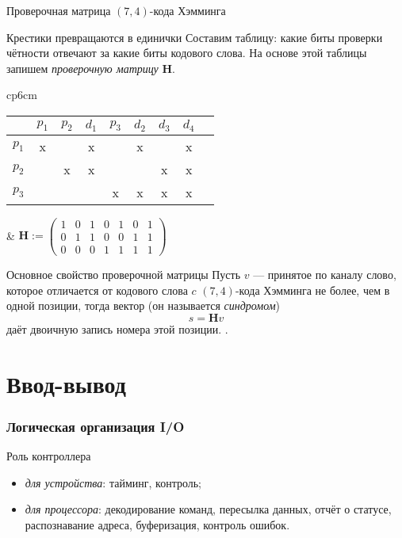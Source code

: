\begin{frame}{Проверочная матрица $(7,4)$-кода Хэмминга}
\small
\begin{block}{Крестики превращаются в единички}
Составим таблицу: какие биты проверки чётности отвечают за какие биты кодового слова. На основе этой таблицы запишем \emph{проверочную матрицу} $\mathbf{H}$.

\begin{tabular}{cp{6cm}}
    \begin{tabular}{r|cccccccc}
    \toprule
       & $p_1$ & $p_2$ & $d_1$ & $p_3$ & $d_2$ & $d_3$ & $d_4$ \\
    \midrule
    $p_1$ & x  &    & x  &    & x  &    & x \\
    $p_2$ &    & x  & x  &    &    & x  & x \\
    $p_3$ &    &    &    & x  & x  & x  & x \\
    \bottomrule
    \end{tabular}
&
    $
        \mathbf{H} := \begin{pmatrix}
            1 & 0 & 1 & 0 & 1 & 0 & 1\\
            0 & 1 & 1 & 0 & 0 & 1 & 1\\
            0 & 0 & 0 & 1 & 1 & 1 & 1
        \end{pmatrix}
    $
\end{tabular}%
\end{block}

\begin{block}{Основное свойство проверочной матрицы}
Пусть $v$ — принятое по каналу слово,  которое отличается от кодового слова $c$ $(7,4)$-кода Хэмминга не более, чем в одной позиции, тогда вектор (он называется \emph{синдромом})
\[
    s = \mathbf{H}v
\]
даёт двоичную запись номера этой позиции. \color{red}{Если $s=0$, то $v=c$}.
\end{block}

\end{frame}

\section{Ввод-вывод}

\begin{frame}
\frametitle{Логическая организация I/O}
\pause
\begin{block}{Роль контроллера}
\begin{itemize}
    \item \textit{для устройства}: тайминг, контроль;
    \item \textit{для процессора}: декодирование команд, пересылка данных, отчёт о статусе, распознавание адреса, буферизация, контроль ошибок.
\end{itemize}
\end{block}
\end{frame}

